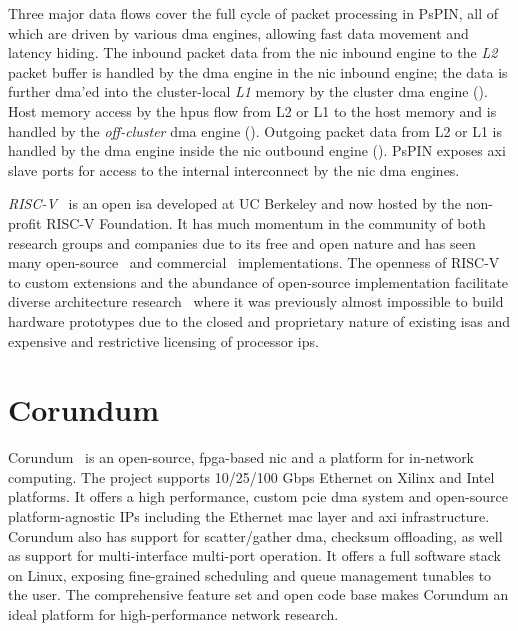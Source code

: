 Three major data flows cover the full cycle of packet processing in PsPIN, all of which are driven by various \ac{dma} engines, allowing fast data movement and latency hiding.  The inbound packet data from the \ac{nic} inbound engine to the \emph{L2} packet buffer is handled by the \ac{dma} engine in the \ac{nic} inbound engine; the data is further \ac{dma}'ed into the cluster-local \emph{L1} memory by the cluster \ac{dma} engine ().  Host memory access by the \ac{hpu}s flow from L2 or L1 to the host memory and is handled by the \emph{off-cluster} \ac{dma} engine ().  Outgoing packet data from L2 or L1 is handled by the \ac{dma} engine inside the \ac{nic} outbound engine ().  PsPIN exposes \ac{axi} slave ports for access to the internal interconnect by the \ac{nic} \ac{dma} engines.

\emph{RISC-V}~\cite{asanovic_instruction_2014, waterman_risc-v_2019} is an open \ac{isa} developed at UC Berkeley and now hosted by the non-profit RISC-V Foundation.  It has much momentum in the community of both research groups and companies due to its free and open nature and has seen many open-source~\cite{zhao_sonicboom_2020, asanovic_rocket_2016, rossi_pulp_2015} and commercial~\cite{t-head_t-head_nodate,sifive_sifive_2022} implementations.  The openness of RISC-V to custom extensions and the abundance of open-source implementation facilitate diverse architecture research~\cite{lee_keystone_2020, shao_simba_2019, genc_gemmini_2019, lin_panic_2020, khazraee_rosebud_2023} where it was previously almost impossible to build hardware prototypes due to the closed and proprietary nature of existing \ac{isa}s and expensive and restrictive licensing of processor \ac{ip}s.

\section{Corundum} \label{sec:background-corundum}

Corundum~\cite{forencich_corundum_2020} is an open-source, \ac{fpga}-based \ac{nic} and a platform for in-network computing.  The project supports 10/25/100 Gbps Ethernet on Xilinx and Intel platforms.  It offers a high performance, custom \ac{pcie} \ac{dma} system and open-source platform-agnostic IPs including the Ethernet \ac{mac} layer and \ac{axi} infrastructure.  Corundum also has support for scatter/gather \ac{dma}, checksum offloading, as well as support for multi-interface multi-port operation.  It offers a full software stack on Linux, exposing fine-grained scheduling and queue management tunables to the user.  The comprehensive feature set and open code base makes Corundum an ideal platform for high-performance network research.

